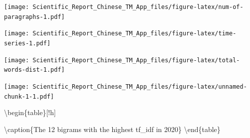 \documentclass[12pt,a4paper]{article}
\let\origfigure\figure
\let\endorigfigure\endfigure
\renewenvironment{figure}[1][2] {
    \expandafter\origfigure\expandafter[H]
} {
    \endorigfigure
}
\begin{document}
\begin{figure}
\centering
\texttt{[image: Scientific\_Report\_Chinese\_TM\_App\_files/figure-latex/num-of-paragraphs-1.pdf]}
\caption{\label{fig:num-of-paragraphs}Distribution of Number of Paragraphs in the Newspaper Page}
\end{figure}

\begin{figure}
\centering
\texttt{[image: Scientific\_Report\_Chinese\_TM\_App\_files/figure-latex/time-series-1.pdf]}
\caption{\label{fig:time-series}Word counts in the page of the newspaper per day}
\end{figure}

\begin{figure}
\centering
\texttt{[image: Scientific\_Report\_Chinese\_TM\_App\_files/figure-latex/total-words-dist-1.pdf]}
\caption{\label{fig:total-words-dist}How bulky is a page of a newspaper in terms of word counts?}
\end{figure}

\begin{figure}
\centering
\texttt{[image: Scientific\_Report\_Chinese\_TM\_App\_files/figure-latex/unnamed-chunk-1-1.pdf]}
\caption{\label{fig:unnamed-chunk-1}Term Frequency Distribution per page of the newpaper}
\end{figure}

\textbackslash begin\{table\}{[}!h{]}

\textbackslash caption\{\label{tab:bigrams}The 12 bigrams with the highest tf\_idf in 2020\}
\centering
{}
\textbackslash end\{table\}
\end{document}
